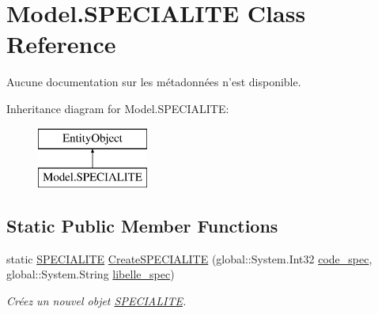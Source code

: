 \hypertarget{class_model_1_1_s_p_e_c_i_a_l_i_t_e}{\section{Model.\-S\-P\-E\-C\-I\-A\-L\-I\-T\-E Class Reference}
\label{class_model_1_1_s_p_e_c_i_a_l_i_t_e}
}


Aucune documentation sur les métadonnées n'est disponible.  


Inheritance diagram for Model.\-S\-P\-E\-C\-I\-A\-L\-I\-T\-E\-:\begin{figure}[H]
\begin{center}
\leavevmode
\includegraphics[height=2.000000cm]{class_model_1_1_s_p_e_c_i_a_l_i_t_e}
\end{center}
\end{figure}
\subsection*{Static Public Member Functions}
\begin{DoxyCompactItemize}
\item 
static \hyperlink{class_model_1_1_s_p_e_c_i_a_l_i_t_e}{S\-P\-E\-C\-I\-A\-L\-I\-T\-E} \hyperlink{class_model_1_1_s_p_e_c_i_a_l_i_t_e_ac40ba96bb21c40f9df63224799ad63cd}{Create\-S\-P\-E\-C\-I\-A\-L\-I\-T\-E} (global\-::\-System.\-Int32 \hyperlink{class_model_1_1_s_p_e_c_i_a_l_i_t_e_a3f2f2a136e0e517600c23a5ebb9d9cac}{code\-\_\-spec}, global\-::\-System.\-String \hyperlink{class_model_1_1_s_p_e_c_i_a_l_i_t_e_a82916a9c724d347181c4e30fba74c3ff}{libelle\-\_\-spec})
\begin{DoxyCompactList}\small\item\em Créez un nouvel objet \hyperlink{class_model_1_1_s_p_e_c_i_a_l_i_t_e}{S\-P\-E\-C\-I\-A\-L\-I\-T\-E}. \end{DoxyCompactList}\end{DoxyCompactItemize}
